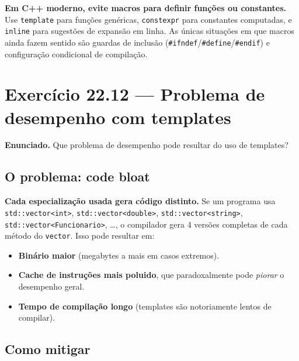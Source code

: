 \documentclass[11pt,a4paper]{article}
\begin{document}
\begin{boaprat}
\textbf{Em C++ moderno, evite macros para definir fun\c{c}\~oes ou constantes.} Use \texttt{template} para fun\c{c}\~oes gen\'ericas, \texttt{constexpr} para constantes computadas, e \texttt{inline} para sugest\~oes de expans\~ao em linha. As \'unicas situa\c{c}\~oes em que macros ainda fazem sentido s\~ao guardas de inclus\~ao (\texttt{\#ifndef}/\texttt{\#define}/\texttt{\#endif}) e configura\c{c}\~ao condicional de compila\c{c}\~ao.
\end{boaprat}

\newpage
\section{Exerc\'icio 22.12 --- Problema de desempenho com templates}

\begin{enunciado}
\textbf{Enunciado.} Que problema de desempenho pode resultar do uso de templates?
\end{enunciado}

\subsection*{O problema: code bloat}

\textbf{Cada especializa\c{c}\~ao usada gera c\'odigo distinto.} Se um programa usa \texttt{std::vector<int>}, \texttt{std::vector<double>}, \texttt{std::vector<string>}, \texttt{std::vector<Funcionario>}, \ldots, o compilador gera 4 vers\~oes completas de cada m\'etodo do \texttt{vector}. Isso pode resultar em:

\begin{itemize}[leftmargin=*,itemsep=0pt]
  \item \textbf{Bin\'ario maior} (megabytes a mais em casos extremos).
  \item \textbf{Cache de instru\c{c}\~oes mais poluido}, que paradoxalmente pode \emph{piorar} o desempenho geral.
  \item \textbf{Tempo de compila\c{c}\~ao longo} (templates s\~ao notoriamente lentos de compilar).
\end{itemize}

\subsection*{Como mitigar}
\end{document}
